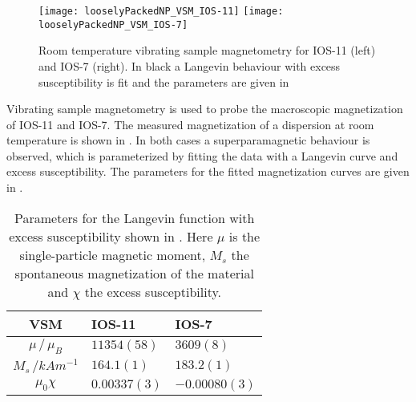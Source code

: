 \documentclass[\main/dresen_thesis.tex]{subfiles}
\begin{document}
  \label{sec:looselyPackedNS:nanoparticle:vsm}
  \begin{figure}[tb]
    \centering
    \texttt{[image: looselyPackedNP\_VSM\_IOS-11]}
    \texttt{[image: looselyPackedNP\_VSM\_IOS-7]}
    \caption{\label{fig:looselyPackedNP:nanoparticle:vsm}Room temperature vibrating sample magnetometry for IOS-11 (left) and IOS-7 (right). In black a Langevin behaviour with excess susceptibility is fit and the parameters are given in }
  \end{figure}

  Vibrating sample magnetometry is used to probe the macroscopic magnetization of IOS-11 and IOS-7.
  The measured magnetization of a dispersion at room temperature is shown in .
  In both cases a superparamagnetic behaviour is observed, which is parameterized by fitting the data with a Langevin curve and excess susceptibility.
  The parameters for the fitted magnetization curves are given in .

  \begin{table}[!htbp]
    \centering
    \caption{\label{tab:looselyPackedNP:nanoparticle:vsm}Parameters for the Langevin function with excess susceptibility shown in . Here $\mu$ is the single-particle magnetic moment, $M_s$ the spontaneous magnetization of the material and $\chi$ the excess susceptibility.}
    \begin{tabular}{ c | l | l }
      \rule{0pt}{2ex} \textbf{VSM} & IOS-11 & IOS-7 \\
      \hline
      \rule{0pt}{2ex} $\mu \, / \, \mu_B$                       & $11354(58)$   & $3609(8)$\\
      \rule{0pt}{2ex} $M_s \, /  \unit{kAm^{-1}}$               & $164.1(1)$    & $183.2(1)$\\
      \rule{0pt}{2ex} $\mu_0 \chi$                              & $0.00337(3)$  & $-0.00080(3)$\\
      \hline
    \end{tabular}
  \end{table}
\end{document}
